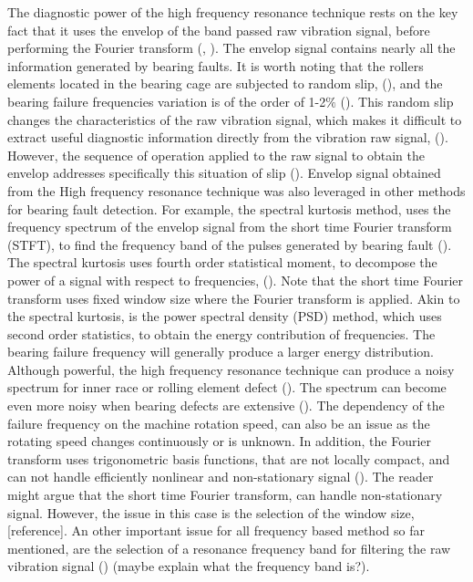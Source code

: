 \documentclass[../Main/thesis.tex]{subfiles}
\begin{document}
\justify
The diagnostic power of the high frequency resonance technique rests on the key fact that it uses the envelop of the band passed raw vibration signal, before performing the Fourier transform (\cite{mcfadden1984a}, \cite{randal2010}). The envelop signal contains nearly all the information generated by bearing faults. It is worth noting that the rollers elements located in the bearing cage are subjected to random slip, (\cite{mcfadden1984a}), and the bearing failure frequencies variation is of the order of 1-2$\%$ (\cite{randal2010}). This random slip changes the characteristics of the raw vibration signal, which makes it difficult to extract useful diagnostic information directly from the vibration raw signal, (\cite{randal2010}). However, the sequence of operation applied to the raw signal to obtain the envelop addresses specifically this situation of slip  (\cite{randal2010}). 
\justify
Envelop signal obtained from the High frequency resonance technique was also leveraged in other methods for bearing fault detection. For example, the spectral kurtosis method, uses the frequency spectrum of the envelop signal from the short time Fourier transform (STFT), to find the frequency band of the pulses generated by bearing fault (\cite{randal2010}). The spectral kurtosis uses fourth order statistical moment, to decompose the power of a signal with respect to frequencies, (\cite{randal2010}). Note that the short time Fourier transform uses fixed window size where the Fourier transform is applied. Akin to the spectral kurtosis, is the power spectral density (PSD) method, which uses second order statistics, to obtain the energy contribution of frequencies. The bearing failure frequency will generally produce a larger energy distribution.
\justify
 Although powerful, the high frequency resonance technique can produce a noisy spectrum for inner race or rolling element defect (\cite{mcfadden1984a}). The spectrum can become even more noisy when bearing defects are extensive (\cite{mcfadden1984a}). The dependency of the failure frequency on the machine rotation speed, can also be an issue as the rotating speed changes continuously or is unknown. In addition, the Fourier transform uses trigonometric basis functions, that are not locally compact, and can not handle efficiently nonlinear and non-stationary signal (\cite{huang98}). The reader might argue that the short time Fourier transform, can handle non-stationary signal. However, the issue in this case is the selection of the window size, [reference]. An other important issue for all frequency based method so far mentioned, are the selection of a resonance frequency band for filtering the raw vibration signal (\cite{zhao2014}) (maybe explain what the frequency band is?).
 \justify
 
\end{document}
